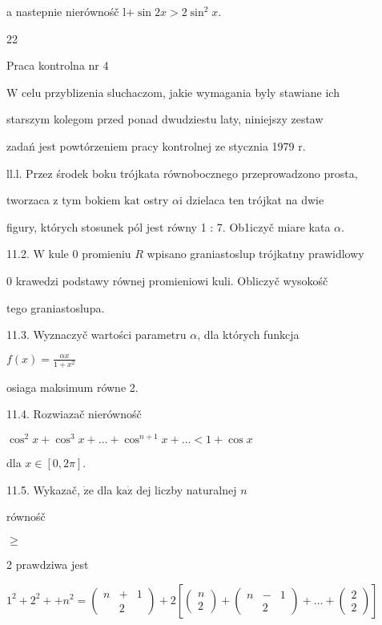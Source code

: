 \documentclass[a4paper,12pt]{article}
\begin{document}
a nastepnie nierównośč l$+ \sin 2x>2\sin^{2}x.$





22

Praca kontrolna nr 4

$\mathrm{W}$ celu przyblizenia sluchaczom, jakie wymagania byly stawiane ich

starszym kolegom przed ponad dwudziestu laty, niniejszy zestaw

zadań jest powtórzeniem pracy kontrolnej ze stycznia 1979 $\mathrm{r}.$

ll.l. Przez środek boku trójkata równobocznego przeprowadzono prosta,

tworzaca $\mathrm{z}$ tym bokiem $\mathrm{k}\mathrm{a}\mathrm{t}$ ostry $\alpha \mathrm{i}$ dzielaca ten trójkat na dwie

figury, których stosunek pól jest równy 1 : 7. Ob1iczyč miare kata $\alpha.$

11.2. $\mathrm{W}$ kule $0$ promieniu $R$ wpisano graniastoslup trójkatny prawidlowy

$0$ krawedzi podstawy równej promieniowi kuli. Obliczyč wysokośč

tego graniastoslupa.

11.3. Wyznaczyč wartości parametru $\alpha$, dla których funkcja

$f(x)=\displaystyle \frac{\alpha x}{1+x^{2}}$

osiaga maksimum równe 2.

11.4. Rozwiazač nierównośč

$\cos^{2}x+\cos^{3}x+\ldots+\cos^{n+1}x+\ldots<1+\cos x$

dla $x\in[0,2\pi].$

11.5. Wykazač, $\dot{\mathrm{z}}\mathrm{e}$ dla $\mathrm{k}\mathrm{a}\dot{\mathrm{z}}$ dej liczby naturalnej $n$

równośč

$\geq$

2 prawdziwa jest

$1^{2}+2^{2}++n^{2}=\left(\begin{array}{lll}
n & + & 1\\
 & 2 & 
\end{array}\right)+2[\left(\begin{array}{l}
n\\
2
\end{array}\right)+\left(\begin{array}{lll}
n & - & 1\\
 & 2 & 
\end{array}\right)+\ldots+\left(\begin{array}{l}
2\\
2
\end{array}\right)]$
\end{document}
